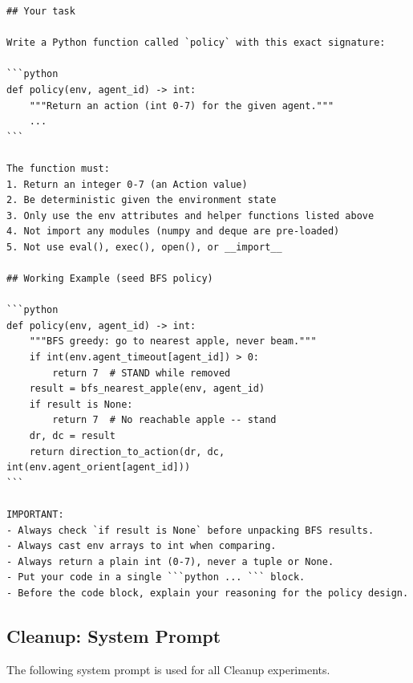 \documentclass{nextgame2026} %
\begin{document}
\begin{lstlisting}[style=pysmall, caption={Gathering system prompt (verbatim).}, basicstyle=\ttfamily\tiny]
## Your task

Write a Python function called `policy` with this exact signature:

```python
def policy(env, agent_id) -> int:
    """Return an action (int 0-7) for the given agent."""
    ...
```

The function must:
1. Return an integer 0-7 (an Action value)
2. Be deterministic given the environment state
3. Only use the env attributes and helper functions listed above
4. Not import any modules (numpy and deque are pre-loaded)
5. Not use eval(), exec(), open(), or __import__

## Working Example (seed BFS policy)

```python
def policy(env, agent_id) -> int:
    """BFS greedy: go to nearest apple, never beam."""
    if int(env.agent_timeout[agent_id]) > 0:
        return 7  # STAND while removed
    result = bfs_nearest_apple(env, agent_id)
    if result is None:
        return 7  # No reachable apple -- stand
    dr, dc = result
    return direction_to_action(dr, dc, int(env.agent_orient[agent_id]))
```

IMPORTANT:
- Always check `if result is None` before unpacking BFS results.
- Always cast env arrays to int when comparing.
- Always return a plain int (0-7), never a tuple or None.
- Put your code in a single ```python ... ``` block.
- Before the code block, explain your reasoning for the policy design.
\end{lstlisting}


\subsection{Cleanup: System Prompt}
\label{app:prompt-cleanup-sys}

The following system prompt is used for all Cleanup experiments.
\end{document}
